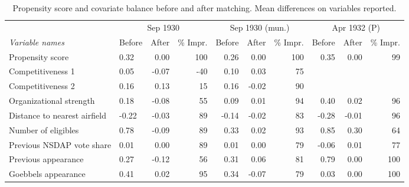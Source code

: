 \begin{table}[t!]
\centering
\caption{Propensity score and covariate balance before and after matching. Mean differences on variables reported.\label{tab:balance1}} 
\begingroup\scriptsize
\begin{tabular}{llrrrrrrrr}
  \toprule
   & \multicolumn{3}{c}{Sep 1930} &  \multicolumn{3}{c}{Sep 1930 (mun.)} & \multicolumn{3}{c}{Apr 1932 (P)}\\\cmidrule(r){2-4} \cmidrule(r){5-7} \cmidrule(r){8-10}\textit{Variable names} & Before & After & \% Impr. & Before & After & \% Impr. & Before & After & \% Impr.\\ \midrule
Propensity score & 0.32 & 0.00 & 100 & 0.26 & 0.00 & 100 & 0.35 & 0.00 & 99 \\ 
  Competitiveness 1 & 0.05 & -0.07 & -40 & 0.10 & 0.03 & 75 &  &  &  \\ 
  Competitiveness 2 & 0.16 & 0.13 & 15 & 0.16 & -0.02 & 90 &  &  &  \\ 
  Organizational strength & 0.18 & -0.08 & 55 & 0.09 & 0.01 & 94 & 0.40 & 0.02 & 96 \\ 
  Distance to nearest airfield & -0.22 & -0.03 & 89 & -0.14 & -0.02 & 83 & -0.28 & -0.01 & 96 \\ 
  Number of eligibles & 0.78 & -0.09 & 89 & 0.33 & 0.02 & 93 & 0.85 & 0.30 & 64 \\ 
  Previous NSDAP vote share & 0.01 & 0.00 & 89 & 0.01 & 0.00 & 79 & -0.06 & 0.01 & 77 \\ 
  Previous appearance & 0.27 & -0.12 & 56 & 0.31 & 0.06 & 81 & 0.79 & 0.00 & 100 \\ 
  Goebbels appearance & 0.41 & 0.02 & 95 & 0.34 & -0.07 & 79 & 0.03 & 0.00 & 100 \\ 
   \bottomrule
\end{tabular}
\endgroup
\end{table}
